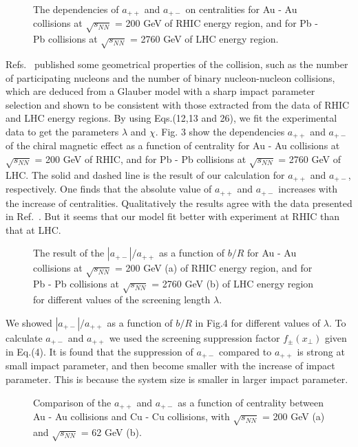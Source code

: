 \documentclass[twocolumn,showpacs,preprintnumbers,amsmath,amssymb]{revtex4}
\begin{document}
\begin{figure}[h!]
\centering {}
\caption{The dependencies of $a_{++}$ and $a_{+-}$ on centralities for Au - Au collisions at $\sqrt{s_{NN}}$ = 200 GeV
of RHIC energy region, and for Pb - Pb collisions at $\sqrt{s_{NN}}$ = 2760 GeV of LHC energy region.}
\label{fig3} %
\end{figure}

Refs.~\cite{lab30,lab31} published some geometrical properties of the collision, such as the number of participating nucleons and the number of binary nucleon-nucleon collisions, which are deduced from a Glauber model with a sharp impact parameter selection and shown to be consistent with those extracted from the data of RHIC and LHC energy regions.
By using Eqs.(12,13 and 26), we fit the experimental data to get the parameters $\lambda$ and $\chi$.  Fig. 3 show the dependencies $a_{++}$ and $a_{+-}$ of the chiral magnetic effect as a function of centrality for Au - Au collisions at $\sqrt{s_{NN}}$ = 200 GeV of RHIC, and for Pb - Pb collisions at $\sqrt{s_{NN}}$ = 2760 GeV of LHC. The solid and dashed line is the result of our calculation for $a_{++}$ and $a_{+-}$, respectively. One finds that the absolute value of $a_{++}$ and $a_{+-}$ increases with the increase of centralities. Qualitatively the results agree with the data presented in Ref.~\cite{lab8,lab9,lab10,lab11}. But it seems that our model fit better with experiment at RHIC than that at LHC.

\begin{figure}[h!]
\centering {}
\caption{The result of the $|a_{+-}|/a_{++}$ as a function of $b/R$ for Au - Au collisions at $\sqrt{s_{NN}}$ = 200 GeV (a) of RHIC energy region, and for Pb - Pb collisions at $\sqrt{s_{NN}}$ = 2760 GeV (b) of LHC energy region for different values of the screening length $\lambda$.}
\label{fig4} %
\end{figure}

We showed $|a_{+-}|/a_{++}$ as a function of $b/R$ in Fig.4 for different values of $\lambda$. To calculate $a_{+-}$ and $a_{++}$ we used the screening suppression factor $f_{\pm}(x_\perp)$ given in Eq.(4). It is found that the suppression of $a_{+-}$ compared to $a_{++}$ is strong at small impact parameter, and then become smaller with the increase of impact parameter. This is because the system size is smaller in larger impact parameter.


\begin{figure}[h!]
\centering {}
\caption{Comparison of the $a_{++}$ and $a_{+-}$ as a function of centrality between Au - Au collisions and Cu - Cu collisions, with $\sqrt{s_{NN}}$ = 200 GeV (a) and $\sqrt{s_{NN}}$ = 62 GeV (b). }

\label{fig5} %
\end{figure}
\end{document}
